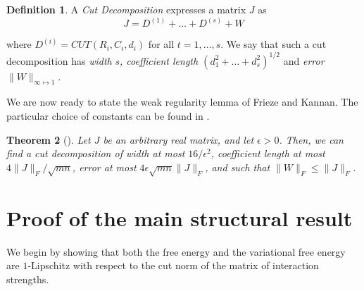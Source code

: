 \documentclass[final, 12pt]{colt2018}
\newtheorem{defn}[theorem]{Definition}
\newtheorem{theorem}{Theorem}[section]
\theoremstyle{definition}
\newtheorem{defn}[theorem]{Definition}
\newtheorem{remark}[theorem]{Remark}
\theoremstyle{plain}
\begin{document}
\begin{defn}
A \emph{Cut Decomposition }expresses a matrix $J$ as 
\[
J=D^{(1)}+\dots+D^{(s)}+W
\]

where $D^{(i)}=CUT(R_{i},C_{i},d_{i})$ for all $t=1,\dots,s$. 
We say that such a cut decomposition has \emph{width }$s$\emph{,
coefficient length $(d_{1}^{2}+\dots+d_{s}^{2})^{1/2}$ }and \emph{error
$\|W\|_{\infty\mapsto1}$}.
\end{defn}

We are now ready to state the weak regularity lemma of Frieze and Kannan. The particular choice of constants can be found in \citep{alon-etal-samplingCSP-conference}. %
\begin{theorem}[\citet{frieze-kannan-matrix}]
\label{fk}
Let $J$ be an arbitrary real matrix, and let $\epsilon>0$.
Then, we can find a cut decomposition of width at most $16/\epsilon^{2}$, 
coefficient length at most $4\|J\|_F/\sqrt{mn}$, error at most $4\epsilon\sqrt{mn}\|J\|_F$, and such that $\|W\|_{F}\leq\|J\|_F$.  
\end{theorem}
\begin{comment}
\begin{remark}
\label{rmk:dense-norm-bounds}
In particular, we have $$\|\vec{W}\|_{\infty}\leq \|J\|_{\infty}+|d_{1}|+\dots+|d_{s}|\leq||J||_{\infty}+\sqrt{s}(d_{1}^{2}+\dots+d_{s}^{2})^{1/2}\leq||J||_{\infty}+\sqrt{16s}\|J\|_F/\sqrt{mn}.$$
\end{remark}
\end{comment}

\section{Proof of the main structural result}
We begin by showing that both the free energy and the variational free energy are $1$-Lipschitz with respect to the cut norm of the matrix of interaction strengths. 
\end{document}
